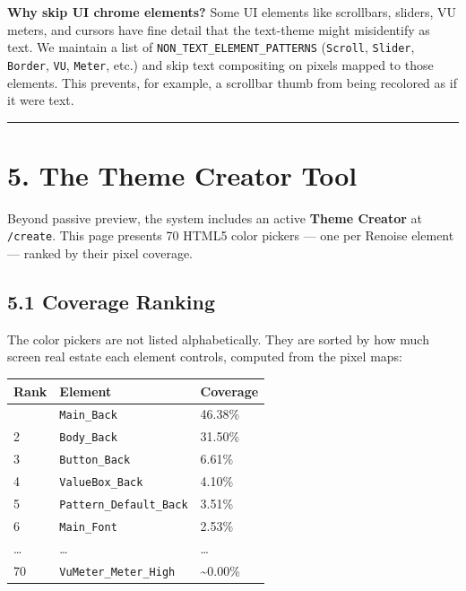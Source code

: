 \documentclass[
  11pt,
  oneside]{report}
\begin{document}
\textbf{Why skip UI chrome elements?} Some UI elements like scrollbars,
sliders, VU meters, and cursors have fine detail that the text-theme
might misidentify as text. We maintain a list of
\texttt{NON\_TEXT\_ELEMENT\_PATTERNS} (\texttt{Scroll}, \texttt{Slider},
\texttt{Border}, \texttt{VU}, \texttt{Meter}, etc.) and skip text
compositing on pixels mapped to those elements. This prevents, for
example, a scrollbar thumb from being recolored as if it were text.

\begin{center}\rule{0.5\linewidth}{0.5pt}\end{center}

\section{5. The Theme Creator Tool}\label{the-theme-creator-tool}

Beyond passive preview, the system includes an active \textbf{Theme
Creator} at \texttt{/create}. This page presents 70 HTML5 color pickers
--- one per Renoise element --- ranked by their pixel coverage.

\subsection{5.1 Coverage Ranking}\label{coverage-ranking}

The color pickers are not listed alphabetically. They are sorted by how
much screen real estate each element controls, computed from the pixel
maps:

\begin{longtable}[]{@{}lll@{}}
\toprule\noalign{}
Rank & Element & Coverage \\
\midrule\noalign{}
\endhead
\bottomrule\noalign{}
\endlastfoot
1 & \texttt{Main\_Back} & 46.38\% \\
2 & \texttt{Body\_Back} & 31.50\% \\
3 & \texttt{Button\_Back} & 6.61\% \\
4 & \texttt{ValueBox\_Back} & 4.10\% \\
5 & \texttt{Pattern\_Default\_Back} & 3.51\% \\
6 & \texttt{Main\_Font} & 2.53\% \\
\ldots{} & \ldots{} & \ldots{} \\
70 & \texttt{VuMeter\_Meter\_High} & \textasciitilde0.00\% \\
\end{longtable}
\end{document}

